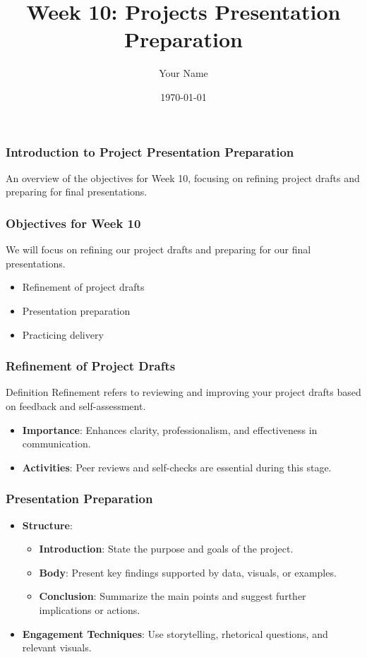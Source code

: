 \documentclass[aspectratio=169]{beamer}
\title[Week 10: Projects Presentation Prep]{Week 10: Projects Presentation Preparation}
\author[Teaching Assistant]{Your Name}
\date{\today}
\begin{document}
\frame{\titlepage}

\begin{frame}[fragile]
    \frametitle{Introduction to Project Presentation Preparation}
    An overview of the objectives for Week 10, focusing on refining project drafts and preparing for final presentations.
\end{frame}

\begin{frame}[fragile]
    \frametitle{Objectives for Week 10}
    We will focus on refining our project drafts and preparing for our final presentations.
    \begin{itemize}
        \item Refinement of project drafts
        \item Presentation preparation
        \item Practicing delivery
    \end{itemize}
\end{frame}

\begin{frame}[fragile]
    \frametitle{Refinement of Project Drafts}
    \begin{block}{Definition}
        Refinement refers to reviewing and improving your project drafts based on feedback and self-assessment.
    \end{block}
    \begin{itemize}
        \item \textbf{Importance}: Enhances clarity, professionalism, and effectiveness in communication.
        \item \textbf{Activities}: Peer reviews and self-checks are essential during this stage.
    \end{itemize}
\end{frame}

\begin{frame}[fragile]
    \frametitle{Presentation Preparation}
    \begin{itemize}
        \item \textbf{Structure}:
        \begin{itemize}
            \item \textbf{Introduction}: State the purpose and goals of the project.
            \item \textbf{Body}: Present key findings supported by data, visuals, or examples.
            \item \textbf{Conclusion}: Summarize the main points and suggest further implications or actions.
        \end{itemize}
        \item \textbf{Engagement Techniques}: Use storytelling, rhetorical questions, and relevant visuals.
    \end{itemize}
\end{frame}
\end{document}
